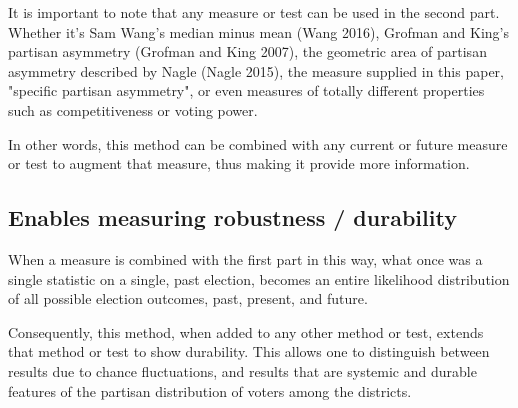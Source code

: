 \documentclass[preprint,12pt]{article}
\begin{document}
It is important to note that any measure or test can be used in the second part.  Whether it's Sam Wang's median minus mean (Wang 2016), Grofman and King's partisan asymmetry  (Grofman and King 2007), the geometric area of partisan asymmetry described by Nagle (Nagle 2015), the measure supplied in this paper, "specific partisan asymmetry", or even measures of totally different properties such as competitiveness or voting power.
 
In other words, this method can be combined with any current or future measure or test to augment that measure, thus making it provide more information.
 
\subsection{Enables measuring robustness / durability}
 
When a measure is combined with the first part in this way, what once was a single statistic on a single, past election, becomes an entire likelihood distribution of all possible election outcomes, past, present, and future.
 
Consequently, this method, when added to any other method or test, extends that method or test to show durability.  This allows one to distinguish between results due to chance fluctuations, and results that are systemic and durable features of the partisan distribution of voters among the districts.


\clearpage
\section*{}
%
%
\clearpage
\end{document}

